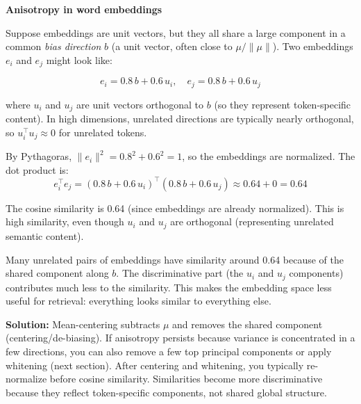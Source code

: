 \begin{examplebox}
\textbf{Anisotropy in word embeddings}

\vspace{0.5em}

Suppose embeddings are unit vectors, but they all share a large component in a common \emph{bias direction} $b$ (a unit vector, often close to $\mu/\|\mu\|$). Two embeddings $e_i$ and $e_j$ might look like:

\begin{equation*}
e_i = 0.8\, b + 0.6\, u_i, \quad e_j = 0.8\, b + 0.6\, u_j
\end{equation*}

where $u_i$ and $u_j$ are unit vectors orthogonal to $b$ (so they represent token-specific content). In high dimensions, unrelated directions are typically nearly orthogonal, so $u_i^\top u_j \approx 0$ for unrelated tokens.

\vspace{0.5em}

By Pythagoras, $\|e_i\|^2 = 0.8^2 + 0.6^2 = 1$, so the embeddings are normalized. The dot product is:
\begin{equation*}
e_i^\top e_j = (0.8\, b + 0.6\, u_i)^\top (0.8\, b + 0.6\, u_j) \approx 0.64 + 0 = 0.64
\end{equation*}

The cosine similarity is 0.64 (since embeddings are already normalized). This is high similarity, even though $u_i$ and $u_j$ are orthogonal (representing unrelated semantic content).

\vspace{0.5em}

Many unrelated pairs of embeddings have similarity around 0.64 because of the shared component along $b$. The discriminative part (the $u_i$ and $u_j$ components) contributes much less to the similarity. This makes the embedding space less useful for retrieval: everything looks similar to everything else.

\vspace{0.5em}

\textbf{Solution:} Mean-centering subtracts $\mu$ and removes the shared component (centering/de-biasing). If anisotropy persists because variance is concentrated in a few directions, you can also remove a few top principal components or apply whitening (next section). After centering and whitening, you typically re-normalize before cosine similarity. Similarities become more discriminative because they reflect token-specific components, not shared global structure.
\end{examplebox}

